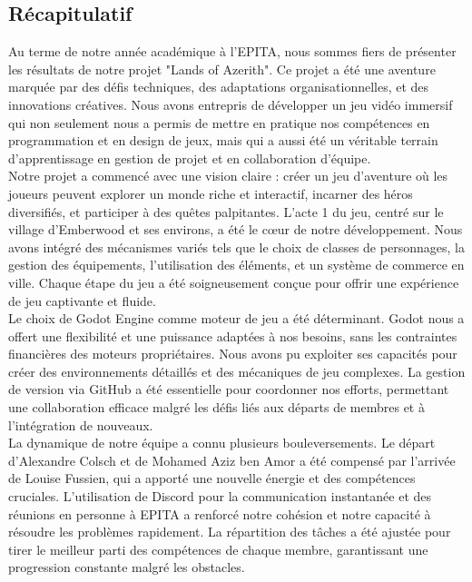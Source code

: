 

\subsection{Récapitulatif}

Au terme de notre année académique à l'EPITA, nous sommes fiers de présenter les résultats de notre projet "Lands of Azerith".
Ce projet a été une aventure marquée par des défis techniques, des adaptations organisationnelles, et des innovations créatives.
Nous avons entrepris de développer un jeu vidéo immersif qui non seulement nous a permis de mettre en pratique nos compétences en programmation et en design de jeux,
mais qui a aussi été un véritable terrain d'apprentissage en gestion de projet et en collaboration d'équipe.
\\

Notre projet a commencé avec une vision claire : créer un jeu d'aventure où les joueurs peuvent explorer un monde riche et interactif,
incarner des héros diversifiés, et participer à des quêtes palpitantes. L'acte 1 du jeu, centré sur le village d'Emberwood et ses environs,
a été le cœur de notre développement. Nous avons intégré des mécanismes variés tels que le choix de classes de personnages, la gestion des équipements,
l'utilisation des éléments, et un système de commerce en ville. Chaque étape du jeu a été soigneusement conçue pour offrir une expérience de jeu captivante et fluide.
\\

Le choix de Godot Engine comme moteur de jeu a été déterminant. Godot nous a offert une flexibilité et une puissance adaptées à nos besoins,
sans les contraintes financières des moteurs propriétaires. Nous avons pu exploiter ses capacités pour créer des environnements détaillés et
des mécaniques de jeu complexes. La gestion de version via GitHub a été essentielle pour coordonner nos efforts, permettant une collaboration
efficace malgré les défis liés aux départs de membres et à l'intégration de nouveaux.
\\

La dynamique de notre équipe a connu plusieurs bouleversements.
Le départ d'Alexandre Colsch et de Mohamed Aziz ben Amor a été compensé par l'arrivée de Louise Fussien, qui a apporté une nouvelle énergie et des compétences cruciales. L'utilisation de Discord pour la communication instantanée et des réunions en personne à EPITA a renforcé notre cohésion et notre capacité à résoudre les problèmes rapidement.
La répartition des tâches a été ajustée pour tirer le meilleur parti des compétences de chaque membre, garantissant une progression constante malgré les obstacles.
\\

